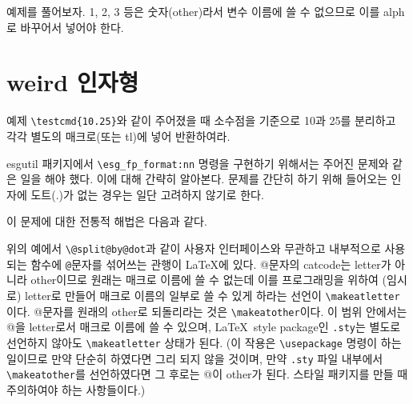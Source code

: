 \documentclass[a4paper,amsmath]{oblivoir}
\begin{document}
\bigskip

예제를 풀어보자. 1, 2, 3 등은 숫자(other)라서 변수 이름에 쓸 수 없으므로
이를 alph로 바꾸어서 넣어야 한다.


\section{weird 인자형}

\begin{questiona}{예제}
\verb|\testcmd{10.25}|와 같이 주어졌을 때 소수점을 기준으로 10과 25를 분리하고 각각 별도의 매크로(또는 tl)에 넣어 반환하여라.
\end{questiona}

\textsf{esgutil} 패키지에서 \verb|\esg_fp_format:nn| 명령을 구현하기 위해서는 주어진 문제와 같은 일을 해야 했다. 이에 대해 간략히 알아본다.
문제를 간단히 하기 위해 들어오는 인자에 도트(.)가 없는 경우는 일단 고려하지 않기로 한다.

이 문제에 대한 전통적 해법은 다음과 같다.

위의 예에서 \verb|\@split@by@dot|과 같이 사용자 인터페이스와 무관하고 내부적으로 사용되는 함수에 \verb|@|문자를 섞어쓰는 관행이 \LaTeX 에 있다. @문자의 catcode는 letter가 아니라 other이므로 원래는 매크로 이름에 쓸 수 없는데 이를 프로그래밍을 위하여 (임시로) letter로 만들어 매크로 이름의 일부로 쓸 수 있게 하라는 선언이 \verb|\makeatletter|이다. @문자를 원래의 other로 되돌리라는 것은 \verb|\makeatother|이다.
이 범위 안에서는 @을 letter로서 매크로 이름에 쓸 수 있으며, \LaTeX\ style package인 \verb|.sty|는 별도로 선언하지 않아도 \verb|\makeatletter| 상태가 된다. (이 작용은 \verb|\usepackage| 명령이 하는 일이므로 만약 단순히 \verb||하였다면 그리 되지 않을 것이며, 만약 \verb|.sty| 파일 내부에서 \verb|\makeatother|를 선언하였다면 그 후로는 @이 other가 된다. 스타일 패키지를 만들 때 주의하여야 하는 사항들이다.)
\end{document}
